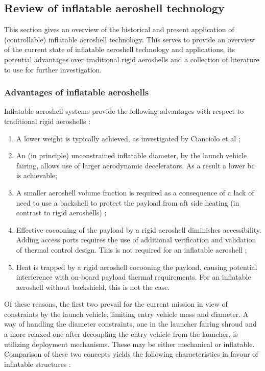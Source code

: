 \subsection{Review of inflatable aeroshell technology}\label{sec:aeroshells}
This section gives an overview of the bistorical and present application of (controllable) inflatable aeroshell technology. This serves to provide an overview of the current state of inflatable aeroshell technology and applications, its potential advantages over traditional rigid aeroshells and a collection of literature to use for further investigation.

\subsubsection{Advantages of inflatable aeroshells}
Inflatable aeroshell systems provide the following advantages with respect to traditional rigid aeroshells \cite{Cassapakis1995, Hughes2005}:
\begin{enumerate}
\item A lower weight is typically achieved, as investigated by Cianciolo et al \cite{Cianciolo2010};
\item An (in principle) unconstrained inflatable diameter, by the launch vehicle fairing, allows use of larger aerodynamic decelerators. As a result a lower \gls{bc} is achievable;
\item A smaller aeroshell volume fraction is required as a consequence of a lack of need to use a backshell to protect the payload from aft side heating (in contrast to rigid aeroshells) \cite{Hughes2005};
\item Effective cocooning of the payload by a rigid aeroshell diminishes accessibility. Adding access ports requires the use of additional verification and validation of thermal control design. This is not required for an inflatable aeroshell \cite{Johnson1997};
\item Heat is trapped by a rigid aeroshell cocooning the payload, causing potential interference with on-board payload thermal requirements. For an inflatable aeroshell without backshield, this is not the case.
\end{enumerate}
Of these reasons, the first two prevail for the current mission in view of constraints by the launch vehicle, limiting entry vehicle mass and diameter. A way of handling the diameter constraints, one in the launcher fairing shroud and a more relaxed one after decoupling the entry vehicle from the launcher, is utilizing deployment mechanisms. These may be either mechanical or inflatable. Comparison of these two concepts yields the following characteristics in favour of inflatable structures \cite{Cassapakis1995}:
